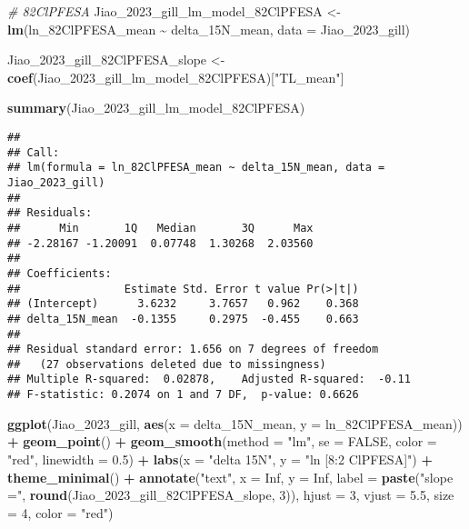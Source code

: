 \documentclass[
]{article}
\newenvironment{Shaded}{\begin{snugshade}}{\end{snugshade}}
\newcommand{\AttributeTok}[1]{\textcolor[rgb]{0.13,0.29,0.53}{#1}}
\newcommand{\CommentTok}[1]{\textcolor[rgb]{0.56,0.35,0.01}{\textit{#1}}}
\newcommand{\ConstantTok}[1]{\textcolor[rgb]{0.56,0.35,0.01}{#1}}
\newcommand{\DecValTok}[1]{\textcolor[rgb]{0.00,0.00,0.81}{#1}}
\newcommand{\FloatTok}[1]{\textcolor[rgb]{0.00,0.00,0.81}{#1}}
\newcommand{\FunctionTok}[1]{\textcolor[rgb]{0.13,0.29,0.53}{\textbf{#1}}}
\newcommand{\NormalTok}[1]{#1}
\newcommand{\OtherTok}[1]{\textcolor[rgb]{0.56,0.35,0.01}{#1}}
\newcommand{\SpecialCharTok}[1]{\textcolor[rgb]{0.81,0.36,0.00}{\textbf{#1}}}
\newcommand{\StringTok}[1]{\textcolor[rgb]{0.31,0.60,0.02}{#1}}
\begin{document}
\begin{Shaded}
\begin{Highlighting}[]
\CommentTok{\# 82ClPFESA}
\NormalTok{Jiao\_2023\_gill\_lm\_model\_82ClPFESA }\OtherTok{\textless{}{-}} \FunctionTok{lm}\NormalTok{(ln\_82ClPFESA\_mean }\SpecialCharTok{\textasciitilde{}}\NormalTok{ delta\_15N\_mean,}
                                    \AttributeTok{data =}\NormalTok{ Jiao\_2023\_gill)}

\NormalTok{Jiao\_2023\_gill\_82ClPFESA\_slope }\OtherTok{\textless{}{-}} \FunctionTok{coef}\NormalTok{(Jiao\_2023\_gill\_lm\_model\_82ClPFESA)[}\StringTok{"TL\_mean"}\NormalTok{]}

\FunctionTok{summary}\NormalTok{(Jiao\_2023\_gill\_lm\_model\_82ClPFESA)}
\end{Highlighting}
\end{Shaded}

\begin{verbatim}
## 
## Call:
## lm(formula = ln_82ClPFESA_mean ~ delta_15N_mean, data = Jiao_2023_gill)
## 
## Residuals:
##      Min       1Q   Median       3Q      Max 
## -2.28167 -1.20091  0.07748  1.30268  2.03560 
## 
## Coefficients:
##                Estimate Std. Error t value Pr(>|t|)
## (Intercept)      3.6232     3.7657   0.962    0.368
## delta_15N_mean  -0.1355     0.2975  -0.455    0.663
## 
## Residual standard error: 1.656 on 7 degrees of freedom
##   (27 observations deleted due to missingness)
## Multiple R-squared:  0.02878,    Adjusted R-squared:  -0.11 
## F-statistic: 0.2074 on 1 and 7 DF,  p-value: 0.6626
\end{verbatim}

\begin{Shaded}
\begin{Highlighting}[]
\FunctionTok{ggplot}\NormalTok{(Jiao\_2023\_gill, }\FunctionTok{aes}\NormalTok{(}\AttributeTok{x =}\NormalTok{ delta\_15N\_mean, }\AttributeTok{y =}\NormalTok{ ln\_82ClPFESA\_mean)) }\SpecialCharTok{+}
  \FunctionTok{geom\_point}\NormalTok{() }\SpecialCharTok{+}
  \FunctionTok{geom\_smooth}\NormalTok{(}\AttributeTok{method =} \StringTok{"lm"}\NormalTok{, }\AttributeTok{se =} \ConstantTok{FALSE}\NormalTok{, }\AttributeTok{color =} \StringTok{"red"}\NormalTok{, }\AttributeTok{linewidth =} \FloatTok{0.5}\NormalTok{) }\SpecialCharTok{+}
  \FunctionTok{labs}\NormalTok{(}\AttributeTok{x =} \StringTok{"delta 15N"}\NormalTok{,}
       \AttributeTok{y =} \StringTok{"ln [8:2 ClPFESA]"}\NormalTok{) }\SpecialCharTok{+}
  \FunctionTok{theme\_minimal}\NormalTok{() }\SpecialCharTok{+}
  \FunctionTok{annotate}\NormalTok{(}\StringTok{"text"}\NormalTok{, }\AttributeTok{x =} \ConstantTok{Inf}\NormalTok{, }\AttributeTok{y =} \ConstantTok{Inf}\NormalTok{, }\AttributeTok{label =} \FunctionTok{paste}\NormalTok{(}\StringTok{"slope ="}\NormalTok{, }\FunctionTok{round}\NormalTok{(Jiao\_2023\_gill\_82ClPFESA\_slope, }\DecValTok{3}\NormalTok{)), }
           \AttributeTok{hjust =} \DecValTok{3}\NormalTok{, }\AttributeTok{vjust =} \FloatTok{5.5}\NormalTok{, }\AttributeTok{size =} \DecValTok{4}\NormalTok{, }\AttributeTok{color =} \StringTok{"red"}\NormalTok{)}
\end{Highlighting}
\end{Shaded}
\end{document}
